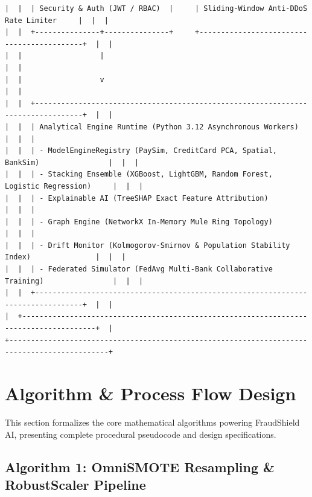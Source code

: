 \documentclass[12pt,a4paper,oneside]{report}
\begin{document}
\begin{lstlisting}
|  |  | Security & Auth (JWT / RBAC)  |     | Sliding-Window Anti-DDoS Rate Limiter     |  |  |
|  |  +---------------+---------------+     +-------------------------------------------+  |  |
|  |                  |                                                                    |  |
|  |                  v                                                                    |  |
|  |  +---------------------------------------------------------------------------------+  |  |
|  |  | Analytical Engine Runtime (Python 3.12 Asynchronous Workers)                    |  |  |
|  |  | - ModelEngineRegistry (PaySim, CreditCard PCA, Spatial, BankSim)                |  |  |
|  |  | - Stacking Ensemble (XGBoost, LightGBM, Random Forest, Logistic Regression)     |  |  |
|  |  | - Explainable AI (TreeSHAP Exact Feature Attribution)                           |  |  |
|  |  | - Graph Engine (NetworkX In-Memory Mule Ring Topology)                          |  |  |
|  |  | - Drift Monitor (Kolmogorov-Smirnov & Population Stability Index)               |  |  |
|  |  | - Federated Simulator (FedAvg Multi-Bank Collaborative Training)                |  |  |
|  |  +---------------------------------------------------------------------------------+  |  |
|  +---------------------------------------------------------------------------------------+  |
+---------------------------------------------------------------------------------------------+
\end{lstlisting}


\section{Algorithm \& Process Flow Design}

This section formalizes the core mathematical algorithms powering FraudShield AI, presenting complete procedural pseudocode and design specifications.


\subsection{Algorithm 1: OmniSMOTE Resampling \& RobustScaler Pipeline}
\end{document}
